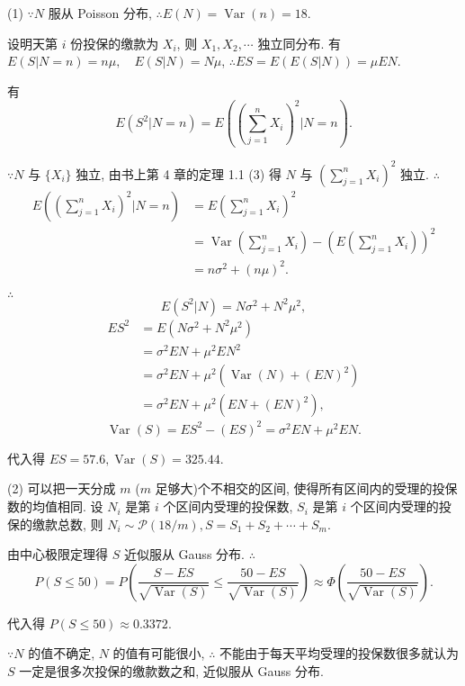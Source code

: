 \documentclass{ctexart}
\begin{document}
\begin{solution}
    (1) $\because N$ 服从 Poisson 分布, $\therefore E(N)=\operatorname{Var}(n)=18$.
    
    设明天第 $i$ 份投保的缴款为 $X_i$, 则 $X_1,X_2,\cdots$ 独立同分布. 有 $E(S|N=n)=n\mu,\quad E(S|N)=N\mu$, $\therefore ES=E(E(S|N))=\mu EN$.

    有
    \[E(S^2|N=n)=E\left(\left(\sum\limits_{j=1}^nX_i\right)^2\Bigg|N=n\right).\]

    $\because N$ 与 $\{X_i\}$ 独立, 由书上第 4 章的定理 1.1 (3) 得 $N$ 与 $\left(\sum\limits_{j=1}^nX_i\right)^2$ 独立. $\therefore$
    \begin{align*}
        E\left(\left(\sum\limits_{j=1}^nX_i\right)^2\Bigg|N=n\right) & =E\left(\sum\limits_{j=1}^nX_i\right)^2 \\
        & =\operatorname{Var}\left(\sum\limits_{j=1}^nX_i\right)-\left(E\left(\sum\limits_{j=1}^nX_i\right)\right)^2 \\
        & =n\sigma^2+(n\mu)^2.
    \end{align*}

    $\therefore$
    \[E(S^2|N)=N\sigma^2+N^2\mu^2,\]
    \begin{align*}
        ES^2 & =E(N\sigma^2+N^2\mu^2) \\
        & =\sigma^2EN+\mu^2EN^2 \\
        & =\sigma^2EN+\mu^2(\operatorname{Var}(N)+(EN)^2) \\
        & =\sigma^2EN+\mu^2(EN+(EN)^2),
    \end{align*}
    \[\operatorname{Var}(S)=ES^2-(ES)^2=\sigma^2EN+\mu^2EN.\]

    代入得 $ES=57.6,\operatorname{Var}(S)=325.44$.

    (2) 可以把一天分成 $m$ ($m$ 足够大)个不相交的区间, 使得所有区间内的受理的投保数的均值相同. 设 $N_i$ 是第 $i$ 个区间内受理的投保数, $S_i$ 是第 $i$ 个区间内受理的投保的缴款总数, 则 $N_i\sim\mathcal{P}(18/m),S=S_1+S_2+\cdots+S_m$.

    由中心极限定理得 $S$ 近似服从 Gauss 分布. $\therefore$
    \[P(S\leq50)=P\left(\dfrac{S-ES}{\sqrt{\operatorname{Var}(S)}}\leq\dfrac{50-ES}{\sqrt{\operatorname{Var}(S)}}\right)\approx\Phi\left(\dfrac{50-ES}{\sqrt{\operatorname{Var}(S)}}\right).\]

    代入得 $P(S\leq50)\approx0.3372$.
\end{solution}
\begin{remark}
    $\because N$ 的值不确定, $N$ 的值有可能很小, $\therefore$ 不能由于每天平均受理的投保数很多就认为 $S$ 一定是很多次投保的缴款数之和, 近似服从 Gauss 分布.
\end{remark}
\end{document}
